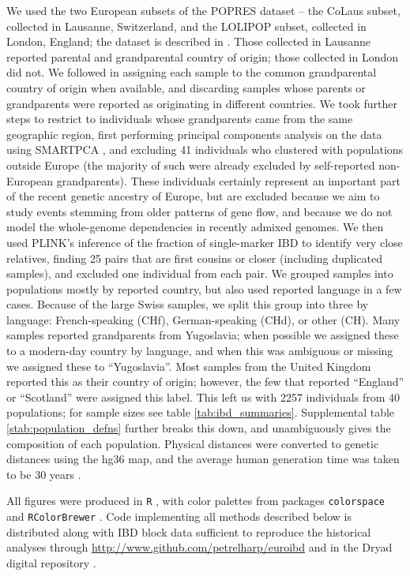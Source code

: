 \documentclass{article}
\begin{document}
We used the two European subsets of the POPRES dataset --
the CoLaus subset, collected in Lausanne, Switzerland,
and the LOLIPOP subset, collected in London, England;
the dataset is described in \citet{nelson2008population}. 
Those collected in Lausanne reported parental and grandparental country of origin;
those collected in London did not.
We followed \citet{novembre2008europe} in 
assigning each sample to the common grandparental country of origin when available,
and discarding samples whose parents or grandparents were reported as originating in different countries.
We took further steps to restrict to individuals whose grandparents came from the same geographic region,
first performing principal components analysis on the data using SMARTPCA \citep{patterson2006population}, 
and excluding 41 individuals who clustered with populations outside Europe 
(the majority of such were already excluded by self-reported non-European grandparents). 
These individuals certainly represent an important part of the recent genetic ancestry of Europe,
but are excluded because we aim to study events stemming from older patterns of gene flow, and because we
do not model the whole-genome dependencies in recently admixed genomes.
We then used PLINK's inference of the fraction of single-marker IBD \citep[Z0, Z1, and Z2,][]{purcell2007plink} to identify very close relatives, 
finding 25 pairs that are first cousins or closer
(including duplicated samples), 
and excluded one individual from each pair.
We grouped samples into populations mostly by reported country,
but also used reported language in a few cases.
Because of the large Swiss samples, 
we split this group into three by language: French-speaking (CHf),
German-speaking (CHd),
or other (CH).
Many samples reported grandparents from Yugoslavia;
when possible we assigned these to a modern-day country by language,
and when this was ambiguous or missing we assigned these to ``Yugoslavia''.
Most samples from the United Kingdom reported this as their country of origin;
however, the few that reported ``England'' or ``Scotland'' were assigned this label.
This left us with 2257 individuals from 40 populations;
for sample sizes see table \ref{tab:ibd_summaries}.
Supplemental table \ref{stab:population_defns} further breaks this down,
and unambiguously gives the composition of each population.
Physical distances were converted to genetic distances using the hg36 map,
and the average human generation time was taken to be 30 years \citep{fenner2005crosscultural}.

All figures were produced in {\tt R} \cite{R},
with color palettes from packages {\tt colorspace} \cite{zeleis2009colorspace} and {\tt RColorBrewer} \cite{plate2011rsvgtipsdevice}.
Code implementing all methods described below is distributed along with IBD block data sufficient to reproduce the historical analyses
through \url{http://www.github.com/petrelharp/euroibd} and in the Dryad digital repository \cite{ourdryad}.
\end{document}
